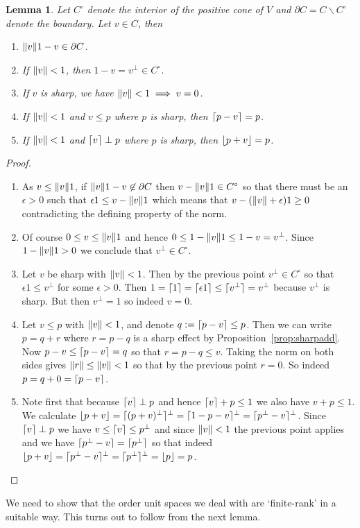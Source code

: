\documentclass[b5paper,onecolumn,12pt,accepted=2019-05-03, issue=1, volume=1, shorttitle=papers/compositionality-1-1]{compositionalityarticle}
\DeclarePairedDelimiter{\ceil}{\lceil}{\rceil}
\DeclarePairedDelimiter{\floor}{\lfloor}{\rfloor}
\newcounter{counter}
\numberwithin{counter}{section}
\newtheorem{lemma}[counter]{Lemma}
\begin{document}
\begin{lemma} \label{lem:var}
	Let $C^\circ$ denote the interior of the positive cone of $V$ and $\partial C = C\backslash C^\circ$ denote the boundary. Let $v\in C$, then 
		\begin{enumerate}
			\item $\norm{v}1 - v \in \partial C$.
			\item If $\norm{v}<1$, then $1-v=v^\perp \in C^\circ$.
			\item If $v$ is sharp, we have $\norm{v}<1 \implies v=0$.
			\item If $\norm{v}<1$ and $v\leq p$ where $p$ is sharp, then $\ceil{p-v}=p$.
            \item If $\norm{v}<1$ and $\ceil{v}\perp p$ where $p$ is sharp, then $\floor{p+v} = p$.
		\end{enumerate}
\end{lemma}
\begin{proof} ~
	\begin{enumerate}
	\item As $v\leq \norm{v}1$, if $\norm{v}1-v \not\in\partial C$ then $v-\norm{v}1\in C^\circ$ so that there must be an $\epsilon>0$ such that $\epsilon 1 \leq v-\norm{v}1$ which means that $v-(\norm{v}+\epsilon)1 \geq 0$ contradicting the defining property of the norm. 
	\item Of course $0\leq v\leq \norm{v}1$ and hence $0\leq 1-\norm{v}1 \leq 1-v=v^\perp$. Since $1-\norm{v}1>0$ we conclude that $v^\perp \in C^\circ$.
	\item Let $v$ be sharp with $\norm{v}<1$. Then by the previous point $v^\perp \in C^\circ$ so that $\epsilon 1\leq v^\perp$ for some $\epsilon>0$. Then $1=\ceil{1}=\ceil{\epsilon 1} \leq \ceil{v^\perp} = v^\perp$ because $v^\perp$ is sharp. But then $v^\perp = 1$ so indeed $v=0$.
	\item Let $v\leq p$ with $\norm{v}<1$, and denote $q:=\ceil{p-v}\leq p$. Then we can write $p=q+r$ where $r=p-q$ is a sharp effect by Proposition~\ref{prop:sharpadd}. Now $p-v\leq \ceil{p-v}=q$ so that $r=p-q\leq v$. Taking the norm on both sides gives $\norm{r} \leq \norm{v}<1$ so that by the previous point $r=0$. So indeed $p=q+0 = \ceil{p-v}$.
    \item Note first that because $\ceil{v}\perp p$ and hence $\ceil{v}+p\leq 1$ we also have $v+p\leq 1$. We calculate $\floor{p+v} = \ceil{(p+v)^\perp}^\perp = \ceil{1-p-v}^\perp = \ceil{p^\perp - v}^\perp$. Since $\ceil{v}\perp p$ we have $v\leq \ceil{v}\leq p^\perp$ and since $\norm{v}<1$ the previous point applies and we have $\ceil{p^\perp - v} = \ceil{p^\perp}$ so that indeed $\floor{p+v} = \ceil{p^\perp -v}^\perp = \ceil{p^\perp}^\perp = \floor{p}=p$. \qedhere
	\end{enumerate}
\end{proof}
We need to show that the order unit spaces we deal with are `finite-rank' in a suitable way. This turns out to follow from the next lemma.
\end{document}
